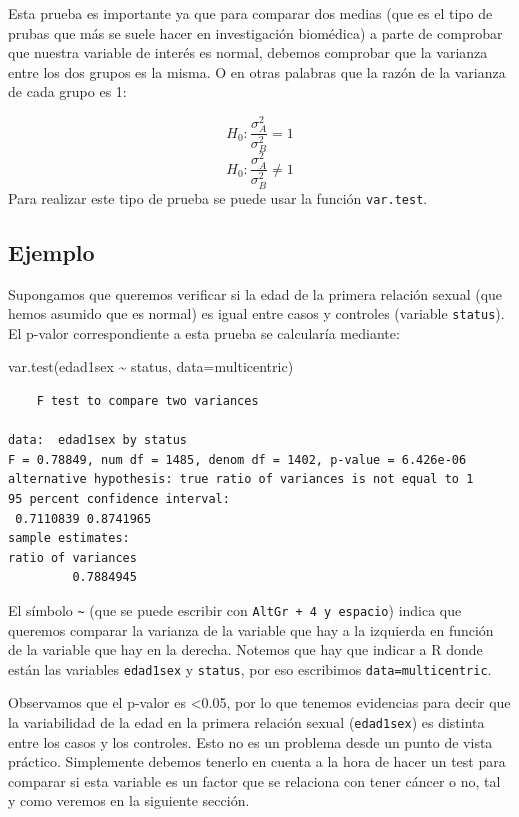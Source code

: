 \documentclass[
]{book}
\newenvironment{Shaded}{\begin{snugshade}}{\end{snugshade}}
\newcommand{\AttributeTok}[1]{\textcolor[rgb]{0.77,0.63,0.00}{#1}}
\newcommand{\FunctionTok}[1]{\textcolor[rgb]{0.00,0.00,0.00}{#1}}
\newcommand{\NormalTok}[1]{#1}
\newcommand{\SpecialCharTok}[1]{\textcolor[rgb]{0.00,0.00,0.00}{#1}}
\begin{document}
Esta prueba es importante ya que para comparar dos medias (que es el tipo de prubas que más se suele hacer en investigación biomédica) a parte de comprobar que nuestra variable de interés es normal, debemos comprobar que la varianza entre los dos grupos es la misma. O en otras palabras que la razón de la varianza de cada grupo es 1:

\[H_0: \frac{\sigma_{A}^2}{\sigma_{B}^2} = 1\]
\[H_0: \frac{\sigma_{A}^2}{\sigma_{B}^2} \neq 1\]
Para realizar este tipo de prueba se puede usar la función \texttt{var.test}.

\hypertarget{ejemplo-2}{%
\subsection*{Ejemplo}\label{ejemplo-2}}

Supongamos que queremos verificar si la edad de la primera relación sexual (que hemos asumido que es normal) es igual entre casos y controles (variable \texttt{status}). El p-valor correspondiente a esta prueba se calcularía mediante:

\begin{Shaded}
\begin{Highlighting}[]
\FunctionTok{var.test}\NormalTok{(edad1sex }\SpecialCharTok{\textasciitilde{}}\NormalTok{ status, }\AttributeTok{data=}\NormalTok{multicentric)}
\end{Highlighting}
\end{Shaded}

\begin{verbatim}
    F test to compare two variances

data:  edad1sex by status
F = 0.78849, num df = 1485, denom df = 1402, p-value = 6.426e-06
alternative hypothesis: true ratio of variances is not equal to 1
95 percent confidence interval:
 0.7110839 0.8741965
sample estimates:
ratio of variances 
         0.7884945 
\end{verbatim}

El símbolo \texttt{\textasciitilde{}} (que se puede escribir con \texttt{AltGr\ +\ 4\ y\ espacio}) indica que queremos comparar la varianza de la variable que hay a la izquierda en función de la variable que hay en la derecha. Notemos que hay que indicar a R donde están las variables \texttt{edad1sex} y \texttt{status}, por eso escribimos \texttt{data=multicentric}.

Observamos que el p-valor es \textless0.05, por lo que tenemos evidencias para decir que la variabilidad de la edad en la primera relación sexual (\texttt{edad1sex}) es distinta entre los casos y los controles. Esto no es un problema desde un punto de vista práctico. Simplemente debemos tenerlo en cuenta a la hora de hacer un test para comparar si esta variable es un factor que se relaciona con tener cáncer o no, tal y como veremos en la siguiente sección.
\end{document}
